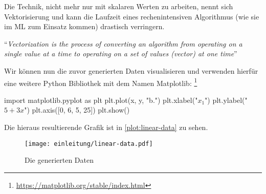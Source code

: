 Die Technik, nicht mehr nur mit skalaren Werten zu arbeiten,
nennt sich Vektorisierung und kann
die Laufzeit eines rechenintensiven Algorithmus
(wie sie im ML zum Einsatz kommen) drastisch verringern.
\begin{aquote}{\parencite{online:vectorization}}
  \enquote{\textit{Vectorization is the process of converting an algorithm
      from operating on a single value at a time to
      operating on a set of values (vector) at one time}}
\end{aquote}
Wir können nun die zuvor generierten Daten visualisieren und verwenden hierfür
eine weitere Python Bibliothek mit dem Namen Matplotlib:
\footnote{\url{https://matplotlib.org/stable/index.html}}
\begin{pythoncode}
import matplotlib.pyplot as plt
plt.plot(x, y, "b.")
plt.xlabel("$x_1$")
plt.ylabel("$5 + 3x$")
plt.axis([0, 6, 5, 25])
plt.show()
\end{pythoncode}
\noindent
Die hieraus resultierende Grafik ist in \autoref{plot:linear-data} zu sehen.
\begin{figure}[!h]
  \centering
  \texttt{[image: einleitung/linear-data.pdf]}
  \caption{Die generierten Daten}
  \label{plot:linear-data}
\end{figure}

